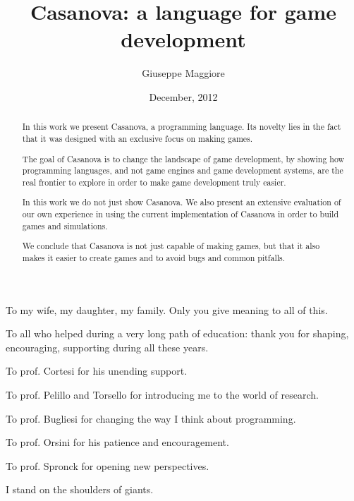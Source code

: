 \documentclass[12pt,american,VeneziaPhdThesis]{PhdThesis}%
\author{Giuseppe Maggiore}
\title{Casanova: a language for game development}
\date{December, 2012}
\begin{document}
\pagestyle{empty}
\maketitle
\begin{dedication}
To my wife, my daughter, my family. Only you give meaning to all of this.
\end{dedication}
\begin{abstract}
In this work we present Casanova, a programming language. Its novelty lies in the fact that it was designed with an exclusive focus on making games.

The goal of Casanova is to change the landscape of game development, by showing how programming languages, and not game engines and game development systems, are the real frontier to explore in order to make game development truly easier.

In this work we do not just show Casanova. We also present an extensive evaluation of our own experience in using the current implementation of Casanova in order to build games and simulations.

We conclude that Casanova is not just capable of making games, but that it also makes it easier to create games and to avoid bugs and common pitfalls.
\end{abstract}

\begin{acknowledgments}
To all who helped during a very long path of education: thank you for shaping, encouraging, supporting during all these years.

To prof. Cortesi for his unending support.

To prof. Pelillo and Torsello for introducing me to the world of research.

To prof. Bugliesi for changing the way I think about programming.

To prof. Orsini for his patience and encouragement.

To prof. Spronck for opening new perspectives.

I stand on the shoulders of giants.
\end{acknowledgments}

\frontmatter
{}
\pagestyle{serif}
\tableofcontents
\listoffigures
\listoftables


\mainmatter
\end{document}
